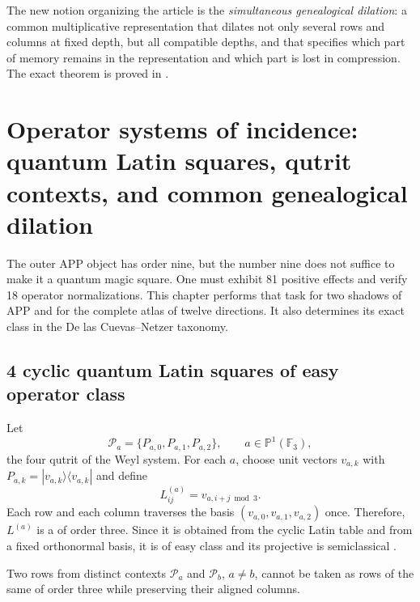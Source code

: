 \begin{bridgebox}
The new notion organizing the article is the \emph{simultaneous
genealogical dilation}: a common multiplicative representation that dilates not only several
rows and columns at fixed depth, but all compatible depths,
and that specifies which part of memory remains in the representation and which
part is lost in compression. The exact theorem is proved in
.
\end{bridgebox}


\section[Operatorial incidence systems]{Operator systems of
incidence: quantum Latin squares, qutrit contexts, and common
genealogical dilation}
\label{p12-83-c22-s3:gmc:chap:qms}

The outer APP object has order nine, but the number nine does not suffice
to make it a quantum magic square. One must exhibit 81 positive effects
and verify 18 operator normalizations. This chapter performs
that task for two shadows of APP and for the complete atlas of twelve
directions. It also determines its exact class in the De las
Cuevas--Netzer taxonomy.

\subsection{4 cyclic quantum Latin squares of easy operator class}

Let
\[
 \mathcal P_a=\{P_{a,0},P_{a,1},P_{a,2}\},
 \qquad a\in\mathbb P^1(\mathbb F_3),
 \tag{GMC-4.1}
\]
the four qutrit \PVM of the Weyl system. For each $a$, choose
unit vectors $v_{a,k}$ with
$P_{a,k}=|v_{a,k}\rangle\langle v_{a,k}|$ and define
\[
 L^{(a)}_{ij}=v_{a,i+j\bmod3}.
 \tag{GMC-4.2}
\]
Each row and each column traverses the basis
$(v_{a,0},v_{a,1},v_{a,2})$ once. Therefore, $L^{(a)}$ is a \QLS of order three.
Since it is obtained from the cyclic Latin table and from a fixed orthonormal basis, it is of easy class and its
projective \QMS is semiclassical
\citep{delascuevas2023latin}.

\begin{proposition}
\label{p12-83-c22-s3:gmc:prop:no-go-mub}
Two rows from distinct contexts
$\mathcal P_a$ and $\mathcal P_b$, $a\ne b$, cannot be taken as rows of the same \QLS of
order three while preserving their aligned columns.
\end{proposition}

